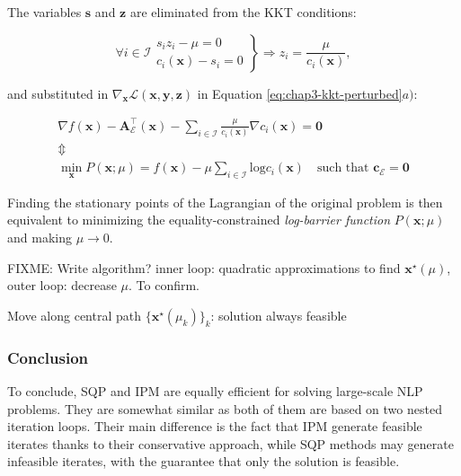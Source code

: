 The variables $\mathbf{s}$ and $\mathbf{z}$ are eliminated from the
KKT conditions:

\begin{equation}
\forall i \in \mathcal{I}
\left.\begin{array}{r}
s_iz_i - \mu = 0\\
c_i(\mathbf{x})-s_i = 0
\end{array}\right\}
\Rightarrow
z_i=\frac{\mu}{c_i(\mathbf{x})},
\end{equation}

and substituted in
$\nabla_{\mathbf{x}}\mathcal{L}(\mathbf{x},\mathbf{y},\mathbf{z})$
in Equation \ref{eq:chap3-kkt-perturbed}$a)$:

\begin{equation}
\begin{array}{c}
\nabla f(\mathbf{x}) - \mathbf{A}_{\mathcal{E}}^{\top}(\mathbf{x}) -
\sum_{i\in\mathcal{I}}\frac{\mu}{c_i(\mathbf{x})}\nabla
c_i(\mathbf{x})=\mathbf{0} \\
\Updownarrow \\
\min_{\mathbf{x}}P(\mathbf{x};\mu)=f(\mathbf{x}) -
\mu\sum_{i\in\mathcal{I}}\text{log}c_i(\mathbf{x}) \quad\text{
  such that }\mathbf{c_{\mathcal{E}}=\mathbf{0}}
\end{array}
\end{equation}

Finding the stationary points of the Lagrangian of the original
problem is then equivalent to minimizing the equality-constrained
\emph{log-barrier function} $P(\mathbf{x};\mu)$ and making $\mu
\rightarrow 0$.

FIXME: Write algorithm? inner loop: quadratic approximations to find
$\mathbf{x}^\star(\mu)$, outer loop: decrease $\mu$. To confirm.

Move along central path $\{\mathbf{x}^\star(\mu_k)\}_k$: solution always
feasible

\subsubsection{Conclusion}

To conclude, SQP and IPM are equally efficient for solving large-scale
NLP problems. They are somewhat similar as both of them are based on
two nested iteration loops. Their main difference is the fact that IPM
generate feasible iterates thanks to their conservative approach,
while SQP methods may generate infeasible iterates, with the guarantee
that only the solution is feasible.

